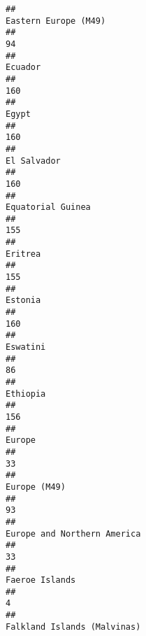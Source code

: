\documentclass[]{article}
\begin{document}
\begin{verbatim}
##                                                                         Eastern Europe (M49) 
##                                                                                           94 
##                                                                                      Ecuador 
##                                                                                          160 
##                                                                                        Egypt 
##                                                                                          160 
##                                                                                  El Salvador 
##                                                                                          160 
##                                                                            Equatorial Guinea 
##                                                                                          155 
##                                                                                      Eritrea 
##                                                                                          155 
##                                                                                      Estonia 
##                                                                                          160 
##                                                                                     Eswatini 
##                                                                                           86 
##                                                                                     Ethiopia 
##                                                                                          156 
##                                                                                       Europe 
##                                                                                           33 
##                                                                                 Europe (M49) 
##                                                                                           93 
##                                                                  Europe and Northern America 
##                                                                                           33 
##                                                                               Faeroe Islands 
##                                                                                            4 
##                                                                  Falkland Islands (Malvinas) 

\end{verbatim}
\end{document}
